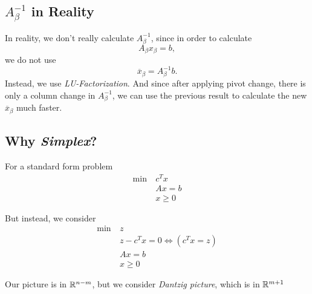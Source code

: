 \subsection{\(A_{\beta}^{-1}\) in Reality}

\begin{note}
	In reality, we don't really calculate \(A^{-1}_{\beta}\), since in order to calculate
	\[
		A_{\beta}x_{\beta} = b,
	\]
	we do not use
	\[
		\overline{x}_{\beta} = A^{-1}_{\beta}b.
	\]
	Instead, we use \emph{LU-Factorization}. And since after applying pivot change,
	there is only a column change in \(A^{-1}_{\beta}\), we can use the previous result
	to calculate the new \(\overline{x}_{\beta}\) much faster.
\end{note}

\subsection{Why \emph{Simplex}?}
For a standard form problem
\begin{align*}
	\min~ & c^Tx    \\
	      & Ax = b  \\
	      & x\geq 0
\end{align*}

But instead, we consider
\begin{align*}
	\min~ & z                                  \\
	      & z - c^{T} x = 0 \iff (c^{T} x = z) \\
	      & Ax = b                             \\
	      & x\geq 0
\end{align*}

\begin{prev}
	Our picture is in \(\mathbb{\MakeUppercase{R}}^{n-m}\), but we consider \emph{Dantzig picture}, which is in \(\mathbb{\MakeUppercase{R}}^{m+1}\)
\end{prev}

